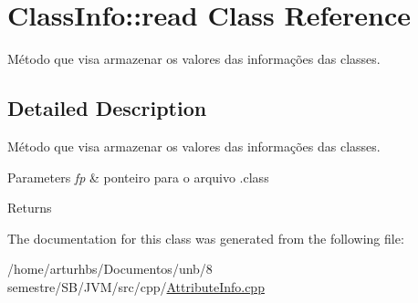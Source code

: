 \hypertarget{classClassInfo_1_1read}{}\section{Class\+Info\+:\+:read Class Reference}
\label{classClassInfo_1_1read}


Método que visa armazenar os valores das informações das classes.  




\subsection{Detailed Description}
Método que visa armazenar os valores das informações das classes. 


\begin{DoxyParams}{Parameters}
{\em fp} & ponteiro para o arquivo .class \\
\hline
\end{DoxyParams}
\begin{DoxyReturn}{Returns}

\end{DoxyReturn}


The documentation for this class was generated from the following file\+:\begin{DoxyCompactItemize}
\item 
/home/arturhbs/\+Documentos/unb/8 semestre/\+S\+B/\+J\+V\+M/src/cpp/\hyperlink{AttributeInfo_8cpp}{Attribute\+Info.\+cpp}\end{DoxyCompactItemize}
